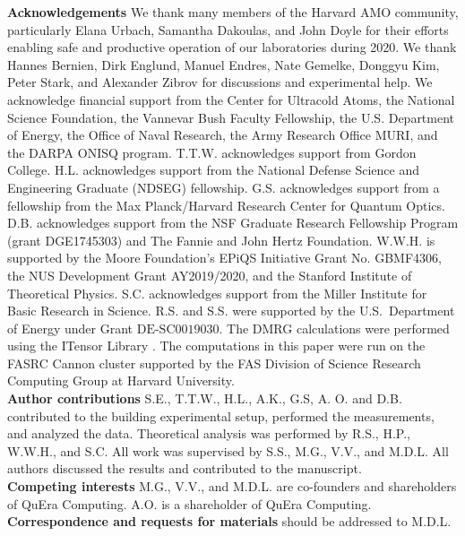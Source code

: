 \documentclass[reprint,twocolumn,secnumarabic,amssymb, aps, prl]{revtex4-1}
\begin{document}
\noindent\textbf{Acknowledgements} We thank many members of the Harvard AMO community, particularly Elana Urbach, Samantha Dakoulas, and John Doyle for their efforts enabling safe and productive operation of our laboratories during 2020. We thank Hannes Bernien, Dirk Englund, Manuel Endres, Nate Gemelke, Donggyu Kim, Peter Stark, and Alexander Zibrov for discussions and experimental help. We acknowledge financial support from the Center for Ultracold Atoms, the National Science Foundation, the Vannevar Bush Faculty Fellowship, the U.S. Department of Energy, the Office of Naval Research, the Army Research Office MURI, and the DARPA ONISQ program. T.T.W. acknowledges support from Gordon College. H.L. acknowledges support from the National Defense Science and Engineering Graduate (NDSEG) fellowship. G.S. acknowledges support from a fellowship from the Max Planck/Harvard Research Center for Quantum Optics. D.B. acknowledges support from the NSF Graduate Research Fellowship Program (grant DGE1745303) and The Fannie and John Hertz Foundation. W.W.H. is supported by the Moore Foundation’s EPiQS Initiative Grant No. GBMF4306, the NUS Development Grant AY2019/2020, and the Stanford Institute of Theoretical Physics. S.C. acknowledges support from the Miller Institute for Basic Research in Science. R.S. and S.S. were supported by the U.S.~Department of Energy under Grant $\mbox{DE-SC0019030}$. The DMRG calculations were performed using the ITensor Library \cite{itensor}. The computations in this paper were run on the FASRC Cannon cluster supported by the FAS Division of Science Research Computing Group at Harvard University.\\

\noindent\textbf{Author contributions}
S.E., T.T.W., H.L., A.K., G.S, A. O. and D.B. 
contributed to the building  experimental setup, performed the measurements, and analyzed the data. Theoretical analysis was performed by R.S., H.P., W.W.H., and S.C. All work was supervised by S.S., M.G., V.V., and M.D.L. All authors discussed the results and contributed to the manuscript.\\

\noindent\textbf{Competing interests} M.G., V.V., and M.D.L. are co-founders and shareholders of QuEra Computing. A.O. is a shareholder of QuEra Computing.\\

\noindent\textbf{Correspondence and requests for materials} should be addressed to M.D.L.\\
\end{document}
